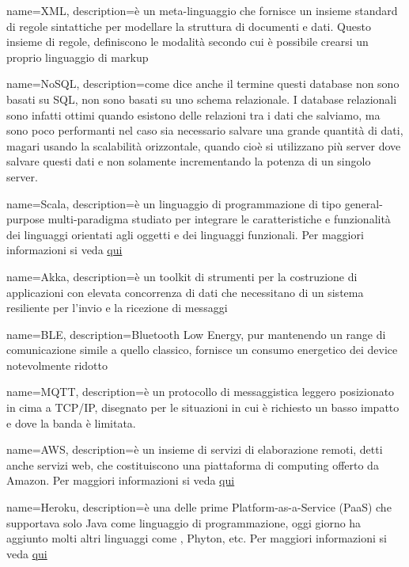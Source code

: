  {
	name=XML,
	description={è un meta-linguaggio che fornisce un insieme standard di regole sintattiche per modellare la struttura di documenti e dati. Questo insieme di regole, definiscono le modalità secondo cui è possibile crearsi un proprio linguaggio di markup}
}

 {
	name=NoSQL,
	description={come dice anche il termine questi database non sono basati su SQL, non sono basati su uno schema relazionale. I database relazionali sono infatti ottimi quando esistono delle relazioni tra i dati che salviamo, ma sono poco performanti nel caso sia necessario salvare una grande quantità di dati, magari usando la scalabilità orizzontale, quando cioè si utilizzano più server dove salvare questi dati e non solamente incrementando la potenza di un singolo server.
}
}

 {
	name=Scala,
	description={è un linguaggio di programmazione di tipo general-purpose multi-paradigma studiato per integrare le caratteristiche e funzionalità dei linguaggi orientati agli oggetti e dei linguaggi funzionali. Per maggiori informazioni si veda \href{https://it.wikipedia.org/wiki/Scala_(linguaggio_di_programmazione)}{qui}}
}

 {
	name=Akka,
	description={è un toolkit di strumenti per la costruzione di applicazioni con elevata concorrenza di dati che necessitano di un sistema resiliente per l'invio e la ricezione di messaggi}
}

 {
	name=BLE,
	description={Bluetooth Low Energy,  pur mantenendo un range di comunicazione simile a quello classico, fornisce un  consumo energetico dei device notevolmente ridotto}
}

 {
	name=MQTT,
	description={è un protocollo di messaggistica leggero posizionato in cima a TCP/IP, disegnato per le situazioni in cui è richiesto un basso impatto e dove la banda è limitata. }
}

 {
	name=AWS,
	description={è un insieme di servizi di elaborazione remoti, detti anche servizi web, che costituiscono una piattaforma di computing offerto da Amazon. Per maggiori informazioni si veda \href{https://aws.amazon.com/it/}{qui}}
}

 {
	name=Heroku,
	description={è una  delle prime  Platform-as-a-Service (PaaS) che supportava solo Java come linguaggio di programmazione, oggi giorno ha aggiunto molti altri linguaggi come , Phyton, etc. Per maggiori informazioni si veda \href{https://www.heroku.com}{qui}}
}

